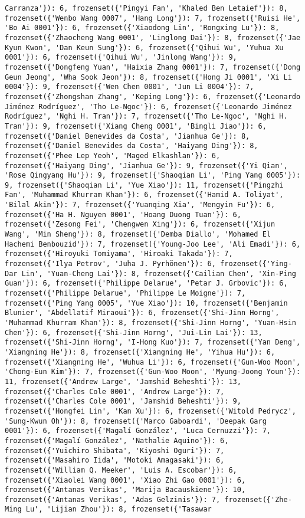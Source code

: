 \documentclass[11pt]{article}
\begin{document}
\begin{verbatim}
Carranza'}): 6, frozenset({'Pingyi Fan', 'Khaled Ben Letaief'}): 8, frozenset({'Wenbo Wang 0007', 'Hang Long'}): 7, frozenset({'Ruisi He', 'Bo Ai 0001'}): 6, frozenset({'Xiaodong Lin', 'Rongxing Lu'}): 8, frozenset({'Zhaocheng Wang 0001', 'Linglong Dai'}): 8, frozenset({'Jae Kyun Kwon', 'Dan Keun Sung'}): 6, frozenset({'Qihui Wu', 'Yuhua Xu 0001'}): 6, frozenset({'Qihui Wu', 'Jinlong Wang'}): 9, frozenset({'Dongfeng Yuan', 'Haixia Zhang 0001'}): 7, frozenset({'Dong Geun Jeong', 'Wha Sook Jeon'}): 8, frozenset({'Hong Ji 0001', 'Xi Li 0004'}): 9, frozenset({'Wen Chen 0001', 'Jun Li 0004'}): 7, frozenset({'Zhongshan Zhang', 'Keping Long'}): 6, frozenset({'Leonardo Jiménez Rodríguez', 'Tho Le-Ngoc'}): 6, frozenset({'Leonardo Jiménez Rodríguez', 'Nghi H. Tran'}): 7, frozenset({'Tho Le-Ngoc', 'Nghi H. Tran'}): 9, frozenset({'Xiang Cheng 0001', 'Bingli Jiao'}): 6, frozenset({'Daniel Benevides da Costa', 'Jianhua Ge'}): 8, frozenset({'Daniel Benevides da Costa', 'Haiyang Ding'}): 8, frozenset({'Phee Lep Yeoh', 'Maged Elkashlan'}): 6, frozenset({'Haiyang Ding', 'Jianhua Ge'}): 9, frozenset({'Yi Qian', 'Rose Qingyang Hu'}): 9, frozenset({'Shaoqian Li', 'Ping Yang 0005'}): 9, frozenset({'Shaoqian Li', 'Yue Xiao'}): 11, frozenset({'Pingzhi Fan', 'Muhammad Khurram Khan'}): 6, frozenset({'Hamid A. Toliyat', 'Bilal Akin'}): 7, frozenset({'Yuanqing Xia', 'Mengyin Fu'}): 6, frozenset({'Ha H. Nguyen 0001', 'Hoang Duong Tuan'}): 6, frozenset({'Zesong Fei', 'Chengwen Xing'}): 6, frozenset({'Xijun Wang', 'Min Sheng'}): 8, frozenset({'Demba Diallo', 'Mohamed El Hachemi Benbouzid'}): 7, frozenset({'Young-Joo Lee', 'Ali Emadi'}): 6, frozenset({'Hiroyuki Tomiyama', 'Hiroaki Takada'}): 7, frozenset({'Ilya Petrov', 'Juha J. Pyrhönen'}): 6, frozenset({'Ying-Dar Lin', 'Yuan-Cheng Lai'}): 8, frozenset({'Cailian Chen', 'Xin-Ping Guan'}): 6, frozenset({'Philippe Delarue', 'Petar J. Grbovic'}): 6, frozenset({'Philippe Delarue', 'Philippe Le Moigne'}): 7, frozenset({'Ping Yang 0005', 'Yue Xiao'}): 10, frozenset({'Benjamin Blunier', 'Abdellatif Miraoui'}): 6, frozenset({'Shi-Jinn Horng', 'Muhammad Khurram Khan'}): 8, frozenset({'Shi-Jinn Horng', 'Yuan-Hsin Chen'}): 6, frozenset({'Shi-Jinn Horng', 'Jui-Lin Lai'}): 13, frozenset({'Shi-Jinn Horng', 'I-Hong Kuo'}): 7, frozenset({'Yan Deng', 'Xiangning He'}): 8, frozenset({'Xiangning He', 'Yihua Hu'}): 6, frozenset({'Xiangning He', 'Wuhua Li'}): 6, frozenset({'Gun-Woo Moon', 'Chong-Eun Kim'}): 7, frozenset({'Gun-Woo Moon', 'Myung-Joong Youn'}): 11, frozenset({'Andrew Large', 'Jamshid Beheshti'}): 13, frozenset({'Charles Cole 0001', 'Andrew Large'}): 7, frozenset({'Charles Cole 0001', 'Jamshid Beheshti'}): 9, frozenset({'Hongfei Lin', 'Kan Xu'}): 6, frozenset({'Witold Pedrycz', 'Sung-Kwun Oh'}): 8, frozenset({'Marco Gaboardi', 'Deepak Garg 0001'}): 6, frozenset({'Magalí González', 'Luca Cernuzzi'}): 7, frozenset({'Magalí González', 'Nathalie Aquino'}): 6, frozenset({'Yuichiro Shibata', 'Kiyoshi Oguri'}): 7, frozenset({'Masahiro Iida', 'Motoki Amagasaki'}): 6, frozenset({'William Q. Meeker', 'Luis A. Escobar'}): 6, frozenset({'Xiaolei Wang 0001', 'Xiao Zhi Gao 0001'}): 6, frozenset({'Antanas Verikas', 'Marija Bacauskiene'}): 10, frozenset({'Antanas Verikas', 'Adas Gelzinis'}): 7, frozenset({'Zhe-Ming Lu', 'Lijian Zhou'}): 8, frozenset({'Tasawar 
\end{verbatim}
\end{document}
